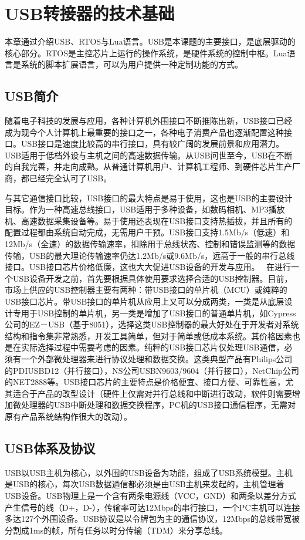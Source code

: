 


\chapter{USB转接器的技术基础}
本章通过介绍USB、RTOS与Lua语言。USB是本课题的主要接口，是底层驱动的核心部分。RTOS是主控芯片上运行的操作系统，是硬件系统的控制中枢。Lua语言是系统的脚本扩展语言，可以为用户提供一种定制功能的方式。
\section{USB简介}
随着电子科技的发展与应用，各种计算机外围接口不断推陈出新，USB接口已经成为现今个人计算机上最重要的接口之一，各种电子消费产品也逐渐配置这种接口。USB接口是速度比较高的串行接口，具有较广阔的发展前景和应用潜力。USB适用于低档外设与主机之间的高速数据传输。从USB问世至今，USB在不断的自我完善，并走向成熟。从普通计算机用户、计算机工程师、到硬件芯片生产厂商，都已经完全认可了USB。

与其它通信接口比较，USB接口的最大特点是易于使用，这也是USB的主要设计目标。作为一种高速总线接口，USB适用于多种设备，如数码相机、MP3播放机、高速数据采集设备等。易于使用还表现在USB接口支持热插拔，并且所有的配置过程都由系统自动完成，无需用户干预。USB接口支持1.5Mb/s（低速）和12Mb/s（全速）的数据传输速率，扣除用于总线状态、控制和错误监测等的数据传输，USB的最大理论传输速率仍达1.2Mb/s或9.6Mb/s，远高于一般的串行总线接口。USB接口芯片价格低廉，这也大大促进USB设备的开发与应用。 
在进行一个USB设备开发之前，首先要根据具体使用要求选择合适的USB控制器。目前，市场上供应的USB控制器主要有两种：带USB接口的单片机（MCU）或纯粹的USB接口芯片。带USB接口的单片机从应用上又可以分成两类，一类是从底层设计专用于USB控制的单片机，另一类是增加了USB接口的普通单片机，如Cypress公司的EZ－USB（基于8051），选择这类USB控制器的最大好处在于开发者对系统结构和指令集非常熟悉，开发工具简单，但对于简单或低成本系统。其价格因素也是在实际选择过程中需要考虑的因素。纯粹的USB接口芯片仅处理USB通信，必须有一个外部微处理器来进行协议处理和数据交换。这类典型产品有Philips公司的PDIUSBD12（并行接口），NS公司USBN9603/9604（并行接口），NetChip公司的NET2888等。USB接口芯片的主要特点是价格便宜、接口方便、可靠性高，尤其适合于产品的改型设计（硬件上仅需对并行总线和中断进行改动，软件则需要增加微处理器的USB中断处理和数据交换程序，PC机的USB接口通信程序，无需对原有产品系统结构作很大的改动）。
\section{USB体系及协议}
USB以USB主机为核心，以外围的USB设备为功能，组成了USB系统模型。主机是USB的核心，每次USB数据通信都必须是由USB主机来发起的，主机管理着USB设备。USB物理上是一个含有两条电源线（VCC，GND）和两条以差分方式产生信号的线（D+，D-），传输率可达12Mbps的串行接口，一个PC主机可以连接多达127个外围设备。USB协议是以令牌包为主的通信协议，12Mbps的总线带宽被分割成1ms的帧，所有任务以时分传输（TDM）来分享总线。






